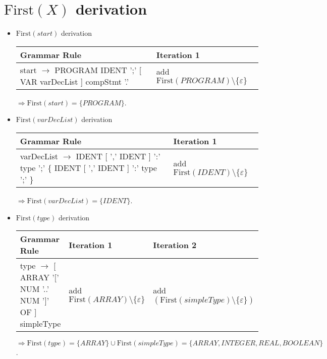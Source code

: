\documentclass[8pt]{scrartcl}
\newcommand{\First}[1]{\mathrm{First}(#1)}
\newcommand{\epsset}{\{\varepsilon\}}
\begin{document}
        \section{$\First{X}$ derivation}
        \begin{itemize}
            \item $\First{start}$ derivation\newline
                \begin{tabular}{|l | l |}
                    \hline
                    \textbf{Grammar Rule} & \textbf{Iteration 1}\\
                    \hline
                    start $\rightarrow$ PROGRAM IDENT ';' [ VAR varDecList ] compStmt '.' & add $\First{PROGRAM} \setminus \epsset$\\
                    \hline
                \end{tabular}\newline
                $\Rightarrow \First{start} = \{PROGRAM\}$.
            \item $\First{varDecList}$ derivation\newline
                \begin{tabular}{|l |l |}
                    \hline
                    \textbf{Grammar Rule} & \textbf{Iteration 1}\\
                    \hline
                    varDecList $\rightarrow$ IDENT [ ',' IDENT ] ':' type ';' \{ IDENT [ ',' IDENT ] ':' type ';' \} & add $\First{IDENT} \setminus \epsset$\\
                    \hline
                \end{tabular}\newline
                $\Rightarrow \First{varDecList} = \{IDENT\}$.
            \item $\First{type}$ derivation\newline
                \begin{tabular}{|l |l |l |}
                    \hline
                    \textbf{Grammar Rule} & \textbf{Iteration 1} & \textbf{Iteration 2}\\
                    \hline
                    type $\rightarrow$ [ ARRAY '$[$' NUM '..' NUM '$]$' OF ] simpleType & add $\First{ARRAY}\setminus \epsset$ & add $\left(\First{simpleType} \setminus \epsset\right)$ \\
                    \hline
                \end{tabular}\newline
                $\Rightarrow \First{type} = \{ARRAY\} \cup \First{simpleType} = \{ARRAY, INTEGER, REAL, BOOLEAN\}$.

\end{itemize}
\end{document}
